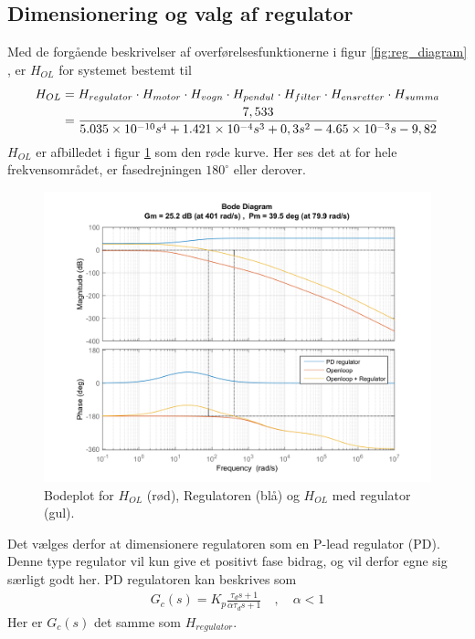 \subsection{Dimensionering og valg af regulator}
Med de forgående beskrivelser af overførelsesfunktionerne i figur \ref{fig:reg_diagram} , er $H_{OL}$ for systemet bestemt til
\begin{align}
H_{OL} &= H_{regulator} \cdot H_{motor} \cdot H_{vogn} \cdot H_{pendul} \cdot H_{filter} \cdot H_{ensretter} \cdot H_{summa} \\
&= \frac{7,533}{\num{5.035e-10} s^4 + \num{1.421E-4} s^3 + 0,3 s^2 - \num{4.65E-3 }s - 9,82}
\end{align} 
$H_{OL}$ er afbilledet i figur \ref{fig:reg_bode_all} som den røde kurve.
Her ses det at for hele frekvensområdet, er fasedrejningen $180^{\circ}$ eller derover.
\begin{figure}[h!]
	\centering
	\includegraphics[width=1\textwidth]{billeder/reg_bode_all.png}
	\caption{Bodeplot for $H_{OL}$ (rød), Regulatoren (blå) og $H_{OL}$ med regulator (gul).}
	\label{fig:reg_bode_all}
\end{figure}
\FloatBlock 
Det vælges derfor at dimensionere regulatoren som en P-lead regulator (PD).
Denne type regulator vil kun give et positivt fase bidrag, og vil derfor egne sig særligt godt her.
PD regulatoren kan beskrives som \cite[s.276, (6.7)]{Reg2015}
\begin{align}
G_c(s) = K_p \frac{\tau_d s + 1}{\alpha \tau_d s + 1} \quad, \quad \alpha < 1  \label{eq:reg_gc}
\end{align}	
Her er $G_c(s)$ det samme som $H_{regulator}$. 

